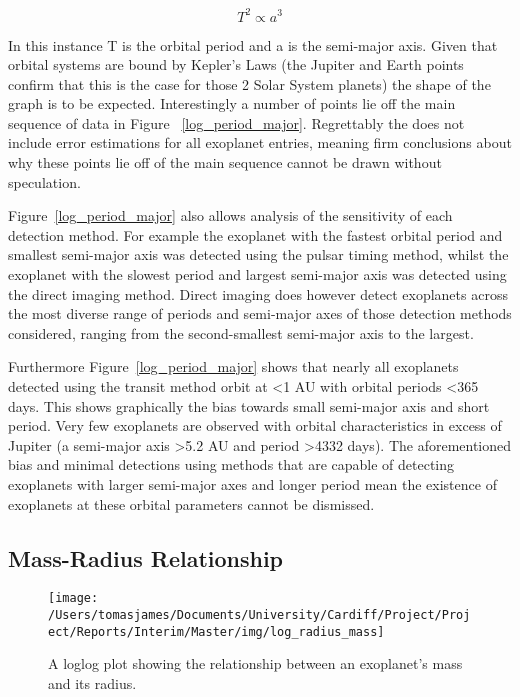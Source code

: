 \documentclass[twoside,4pt]{article}
\begin{document}
\begin{multicols}{2}
\begin{equation} \label{Kepler}
    T^{2} \propto a^{3} 
\end{equation}

In this instance T is the orbital period and a is the semi-major axis. Given that orbital systems are bound by Kepler's Laws (the Jupiter and Earth points confirm that this is the case for those 2 Solar System planets) the shape of the graph is to be expected. Interestingly a number of points lie off the main sequence of data in Figure ~\ref{log_period_major}. Regrettably the \textcite{exo} does not include error estimations for all exoplanet entries, meaning firm conclusions about why these points lie off of the main sequence cannot be drawn without speculation.

Figure~\ref{log_period_major} also allows analysis of the sensitivity of each detection method. For example the exoplanet with the fastest orbital period and smallest semi-major axis was detected using the pulsar timing method, whilst the exoplanet with the slowest period and largest semi-major axis was detected using the direct imaging method. Direct imaging does however detect exoplanets across the most diverse range of periods and semi-major axes of those detection methods considered, ranging from the second-smallest semi-major axis to the largest.

Furthermore Figure~\ref{log_period_major} shows that nearly all exoplanets detected using the transit method orbit at \textless 1 AU with orbital periods \textless 365 days. This shows graphically the bias towards small semi-major axis and short period. Very few exoplanets are observed with orbital characteristics in excess of Jupiter (a semi-major axis \textgreater 5.2 AU and period \textgreater 4332 days). The aforementioned bias and minimal detections using methods that are capable of detecting exoplanets with larger semi-major axes and longer period mean the existence of exoplanets at these orbital parameters cannot be dismissed.

\subsection*{Mass-Radius Relationship}

\begin{figure}[H]
\centering
    \texttt{[image: /Users/tomasjames/Documents/University/Cardiff/Project/Project/Reports/Interim/Master/img/log\_radius\_mass]}
\caption{A loglog plot showing the relationship between an exoplanet's mass and its radius.}\label{log_radius_mass}
\end{figure}


\end{multicols}
\end{document}
